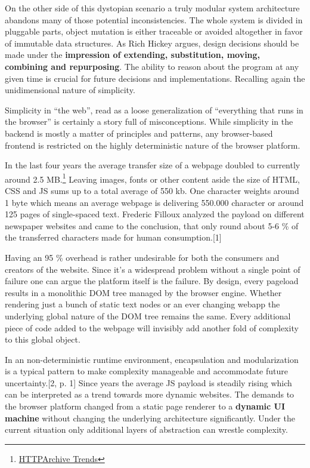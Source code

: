 \documentclass[]{article}
\begin{document}
On the other side of this dystopian scenario a truly modular system
architecture abandons many of those potential inconsistencies. The whole
system is divided in pluggable parts, object mutation is either
traceable or avoided altogether in favor of immutable data structures.
As Rich Hickey argues, design decisions should be made under the
\textbf{impression of extending, substitution, moving, combining and
repurposing}. The ability to reason about the program at any given time
is crucial for future decisions and implementations. Recalling again the
unidimensional nature of simplicity.

Simplicity in ``the web'', read as a loose generalization of
``everything that runs in the browser'' is certainly a story full of
misconceptions. While simplicity in the backend is mostly a matter of
principles and patterns, any browser-based frontend is restricted on the
highly deterministic nature of the browser platform.

In the last four years the average transfer size of a webpage doubled to
currently around 2.5 MB.\footnote{\href{http://httparchive.org/trends.php}{HTTPArchive
  Trends}} Leaving images, fonts or other content aside the size of
HTML, CSS and JS sums up to a total average of 550 kb. One character
weights around 1 byte which means an average webpage is delivering
550.000 character or around 125 pages of single-spaced text. Frederic
Filloux analyzed the payload on different newspaper websites and came to
the conclusion, that only round about 5-6 \% of the transferred
characters made for human consumption.{[}1{]}

Having an 95 \% overhead is rather undesirable for both the consumers
and creators of the website. Since it's a widespread problem without a
single point of failure one can argue the platform itself is the
failure. By design, every pageload results in a monolithic DOM tree
managed by the browser engine. Whether rendering just a bunch of static
text nodes or an ever changing webapp the underlying global nature of
the DOM tree remains the same. Every additional piece of code added to
the webpage will invisibly add another fold of complexity to this global
object.

In an non-deterministic runtime environment, encapsulation and
modularization is a typical pattern to make complexity manageable and
accommodate future uncertainty.{[}2, p. 1{]} Since years the average JS
payload is steadily rising which can be interpreted as a trend towards
more dynamic websites. The demands to the browser platform changed from
a static page renderer to a \textbf{dynamic UI machine} without changing
the underlying architecture significantly. Under the current situation
only additional layers of abstraction can wrestle complexity.
\end{document}
